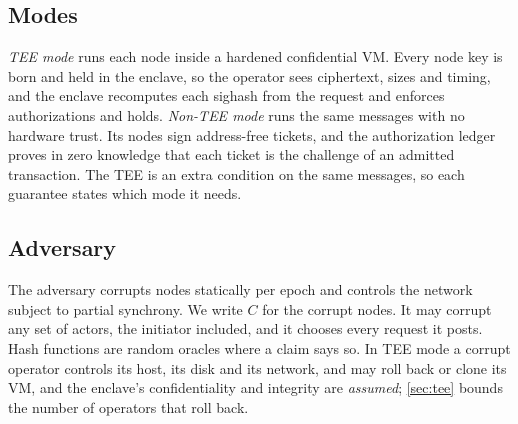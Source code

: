 \subsection{Modes}\label{sec:modes}

\emph{TEE mode} runs each node inside a hardened confidential VM. Every node key is born and held in the enclave, so the operator sees ciphertext, sizes and timing, and the enclave recomputes each sighash from the request and enforces authorizations and holds. \emph{Non-TEE mode} runs the same messages with no hardware trust. Its nodes sign address-free tickets, and the authorization ledger proves in zero knowledge that each ticket is the challenge of an admitted transaction. The TEE is an extra condition on the same messages, so each guarantee states which mode it needs.

\subsection{Adversary}\label{sec:adversary}

The adversary corrupts nodes statically per epoch and controls the network subject to partial synchrony. We write $C$ for the corrupt nodes. It may corrupt any set of actors, the initiator included, and it chooses every request it posts. Hash functions are random oracles where a claim says so. In TEE mode a corrupt operator controls its host, its disk and its network, and may roll back or clone its VM, and the enclave's confidentiality and integrity are \emph{assumed}; \cref{sec:tee} bounds the number of operators that roll back.
